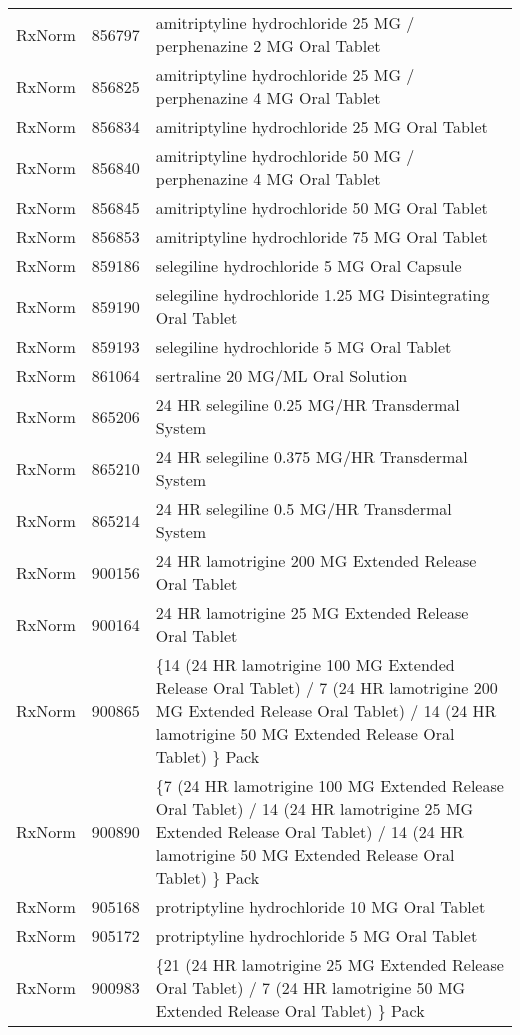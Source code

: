 \begin{longtable}{p{}p{}p{}}
  RxNorm & 856797 & amitriptyline hydrochloride 25 MG / perphenazine 2 MG Oral Tablet \\ 
  RxNorm & 856825 & amitriptyline hydrochloride 25 MG / perphenazine 4 MG Oral Tablet \\ 
  RxNorm & 856834 & amitriptyline hydrochloride 25 MG Oral Tablet \\ 
  RxNorm & 856840 & amitriptyline hydrochloride 50 MG / perphenazine 4 MG Oral Tablet \\ 
  RxNorm & 856845 & amitriptyline hydrochloride 50 MG Oral Tablet \\ 
  RxNorm & 856853 & amitriptyline hydrochloride 75 MG Oral Tablet \\ 
  RxNorm & 859186 & selegiline hydrochloride 5 MG Oral Capsule \\ 
  RxNorm & 859190 & selegiline hydrochloride 1.25 MG Disintegrating Oral Tablet \\ 
  RxNorm & 859193 & selegiline hydrochloride 5 MG Oral Tablet \\ 
  RxNorm & 861064 & sertraline 20 MG/ML Oral Solution \\ 
  RxNorm & 865206 & 24 HR selegiline 0.25 MG/HR Transdermal System \\ 
  RxNorm & 865210 & 24 HR selegiline 0.375 MG/HR Transdermal System \\ 
  RxNorm & 865214 & 24 HR selegiline 0.5 MG/HR Transdermal System \\ 
  RxNorm & 900156 & 24 HR lamotrigine 200 MG Extended Release Oral Tablet \\ 
  RxNorm & 900164 & 24 HR lamotrigine 25 MG Extended Release Oral Tablet \\ 
  RxNorm & 900865 & \{14 (24 HR lamotrigine 100 MG Extended Release Oral Tablet) / 7 (24 HR lamotrigine 200 MG Extended Release Oral Tablet) / 14 (24 HR lamotrigine 50 MG Extended Release Oral Tablet) \} Pack \\ 
  RxNorm & 900890 & \{7 (24 HR lamotrigine 100 MG Extended Release Oral Tablet) / 14 (24 HR lamotrigine 25 MG Extended Release Oral Tablet) / 14 (24 HR lamotrigine 50 MG Extended Release Oral Tablet) \} Pack \\ 
  RxNorm & 905168 & protriptyline hydrochloride 10 MG Oral Tablet \\ 
  RxNorm & 905172 & protriptyline hydrochloride 5 MG Oral Tablet \\ 
  RxNorm & 900983 & \{21 (24 HR lamotrigine 25 MG Extended Release Oral Tablet) / 7 (24 HR lamotrigine 50 MG Extended Release Oral Tablet) \} Pack \\ 

\end{longtable}
